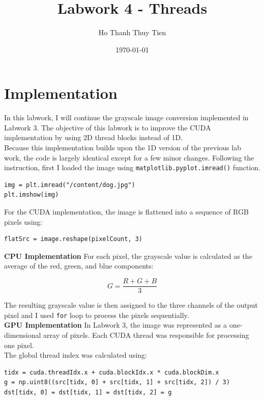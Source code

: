 \documentclass{article}
\title{Labwork 4 - Threads}
\author{Ho Thanh Thuy Tien}
\date{\today}
\begin{document}
\maketitle

\section{Implementation}
In this labwork, I will continue the grayscale image conversion implemented in Labwork 3. The objective of this labwork is to improve the CUDA implementation by using 2D thread blocks instead of 1D.\\ 

Because this implementation builds upon the 1D version of the previous lab work, the code is largely identical except for a few minor changes. Following the instruction, first I loaded the image using \texttt{matplotlib.pyplot.imread()} function.

\begin{verbatim}
img = plt.imread("/content/dog.jpg")
plt.imshow(img)
\end{verbatim}

For the CUDA implementation, the image is flattened into a sequence
of RGB pixels using:

\begin{verbatim}
flatSrc = image.reshape(pixelCount, 3)
\end{verbatim}


\textbf{CPU Implementation}
For each pixel, the grayscale value is calculated as the average of the red, green, and blue components:

\begin{equation}
    G = \frac{R + G + B}{3}
\end{equation}

The resulting grayscale value is then assigned to the three channels
of the output pixel and I used \texttt{for} loop to process the pixels sequentially.\\

\textbf{GPU Implementation} In Labwork 3, the image was represented as a one-dimensional array of pixels. Each CUDA thread was responsible for processing one pixel.\\

The global thread index was calculated using:

\begin{verbatim}
tidx = cuda.threadIdx.x + cuda.blockIdx.x * cuda.blockDim.x
g = np.uint8((src[tidx, 0] + src[tidx, 1] + src[tidx, 2]) / 3)
dst[tidx, 0] = dst[tidx, 1] = dst[tidx, 2] = g
\end{verbatim}
\end{document}
